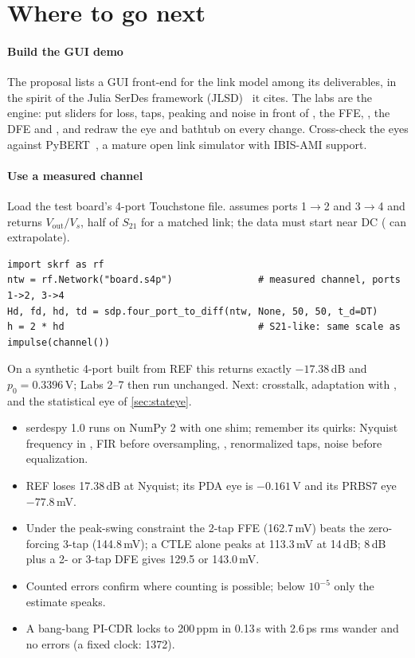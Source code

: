 \section{Where to go next}\label{sec:ch16-next}

\paragraph{Build the GUI demo} The proposal lists a GUI front-end for the link model among its deliverables, in the spirit of the Julia SerDes framework (JLSD)~\cite{p6:jlsd} it cites. The labs are the engine: put sliders for loss, taps, peaking and noise in front of , the FFE, , the DFE and , and redraw the eye and bathtub on every change. Cross-check the eyes against PyBERT~\cite{pybert}, a mature open link simulator with IBIS-AMI support.

\paragraph{Use a measured channel} Load the test board's 4-port Touchstone file.  assumes ports 1$\to$2 and 3$\to$4 and returns $V_\mathrm{out}/V_s$, half of $S_{21}$ for a matched link; the data must start near DC ( can extrapolate).
\begin{lstlisting}
import skrf as rf
ntw = rf.Network("board.s4p")               # measured channel, ports 1->2, 3->4
Hd, fd, hd, td = sdp.four_port_to_diff(ntw, None, 50, 50, t_d=DT)
h = 2 * hd                                  # S21-like: same scale as impulse(channel())
\end{lstlisting}
On a synthetic 4-port built from REF this returns exactly $-17.38$\,dB and $p_0=0.3396$\,V; Labs 2--7 then run unchanged. Next: crosstalk, adaptation with , and the statistical eye of \cref{sec:stateye}.

\begin{takeaways}
\begin{itemize}
  \item serdespy 1.0 runs on NumPy 2 with one shim; remember its quirks: Nyquist frequency in , FIR before oversampling, , renormalized taps, noise before equalization.
  \item REF loses 17.38\,dB at Nyquist; its PDA eye is $-0.161$\,V and its PRBS7 eye $-77.8$\,mV.
  \item Under the peak-swing constraint the 2-tap FFE (162.7\,mV) beats the zero-forcing 3-tap (144.8\,mV); a CTLE alone peaks at 113.3\,mV at 14\,dB; 8\,dB plus a 2- or 3-tap DFE gives 129.5 or 143.0\,mV.
  \item Counted errors confirm  where counting is possible; below $10^{-5}$ only the estimate speaks.
  \item A bang-bang PI-CDR locks to 200\,ppm in 0.13\,\textmu{}s with 2.6\,ps rms wander and no errors (a fixed clock: 1372).
\end{itemize}
\end{takeaways}

